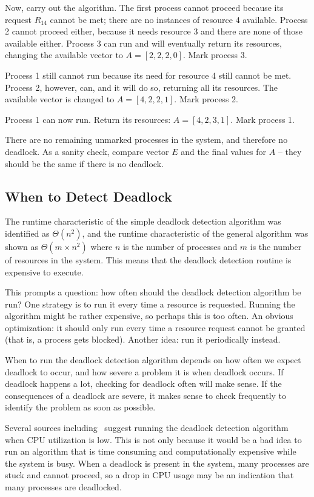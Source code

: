 Now, carry out the algorithm. The first process cannot proceed because its request $R_{14}$ cannot be met; there are no instances of resource 4 available. Process 2 cannot proceed either, because it needs resource 3 and there are none of those available either. Process 3 can run and will eventually return its resources, changing the available vector to $A = [2, 2, 2, 0]$. Mark process 3.

Process 1 still cannot run because its need for resource 4 still cannot be met. Process 2, however, can, and it will do so, returning all its resources. The available vector is changed to $A = [4, 2, 2, 1]$. Mark process 2.

Process 1 can now run. Return its resources: $A = [4, 2, 3, 1]$. Mark process 1.

There are no remaining unmarked processes in the system, and therefore no deadlock. As a sanity check, compare vector $E$ and the final values for $A$ -- they should be the same if there is no deadlock.


\subsection*{When to Detect Deadlock}
The runtime characteristic of the simple deadlock detection algorithm was identified as $\Theta(n^{2})$, and the runtime characteristic of the general algorithm was shown as $\Theta(m \times n^{2})$ where $n$ is the number of processes and $m$ is the number of resources in the system. This means that the deadlock detection routine is expensive to execute.

This prompts a question: how often should the deadlock detection algorithm be run? One strategy is to run it every time a resource is requested. Running the algorithm might be rather expensive, so perhaps this is too often. An obvious optimization: it should only run every time a resource request cannot be granted (that is, a process gets blocked). Another idea: run it periodically instead.

When to run the deadlock detection algorithm depends on how often we expect deadlock to occur, and how severe a problem it is when deadlock occurs. If deadlock happens a lot, checking for deadlock often will make sense. If the consequences of a deadlock are severe, it makes sense to check frequently to identify the problem as soon as possible. 

Several sources including~\cite{mos} suggest running the deadlock detection algorithm when CPU utilization is low. This is not only because it would be a bad idea to run an algorithm that is time consuming and computationally expensive while the system is busy. When a deadlock is present in the system, many processes are stuck and cannot proceed, so a drop in CPU usage may be an indication that many processes are deadlocked.

